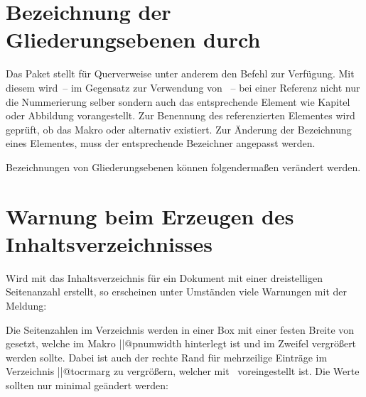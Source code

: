 \section{%
  Bezeichnung der Gliederungsebenen durch %
  \label{sec:tips:references}%
}

%
Das Paket  stellt für Querverweise unter anderem den Befehl 
 zur Verfügung. Mit diesem wird~-- im Gegensatz 
zur Verwendung von ~-- bei einer Referenz nicht nur die Nummerierung 
selber sondern auch das entsprechende Element wie Kapitel oder Abbildung 
vorangestellt. Zur Benennung des referenzierten Elementes wird geprüft, ob das 
Makro  oder alternativ 
 existiert. Zur Änderung der Bezeichnung eines 
Elementes, muss der entsprechende Bezeichner angepasst werden.
%
\begin{Example}
Bezeichnungen von Gliederungsebenen können folgendermaßen verändert werden.
\begin{Code}
\end{Code}
\end{Example}



\section{%
  Warnung beim Erzeugen des Inhaltsverzeichnisses%
}

%
Wird mit  das Inhaltsverzeichnis für ein Dokument mit 
einer dreistelligen Seitenanzahl erstellt, so erscheinen unter Umständen viele 
Warnungen mit der Meldung:
%
\begin{quoting}
\end{quoting}
%
Die Seitenzahlen im Verzeichnis werden in einer Box mit einer festen Breite 
von~\PValue{1.55em} gesetzt, welche im Makro \Macro||{@pnumwidth} hinterlegt 
ist und im Zweifel vergrößert werden sollte. Dabei ist auch der rechte Rand für 
%
mehrzeilige Einträge im Verzeichnis \Macro||{@tocrmarg} zu vergrößern, welcher 
mit~\PValue{2.55em} voreingestellt ist. Die Werte sollten nur minimal geändert 
werden:
%
\begin{quoting}
\begin{Code}
\makeatletter
\renewcommand*{\@pnumwidth}{1.9em}\renewcommand*{\@tocrmarg}{2.9em}
\makeatother
\end{Code}
\end{quoting}



